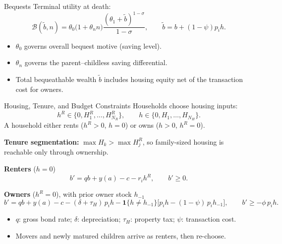 \documentclass[11pt,aspectratio=169]{beamer}
\begin{document}
\begin{frame}{Bequests}
\small
Terminal utility at death:
\[
\mathcal B(\widetilde b,n)= \theta_0\big(1+\theta_n n\big)\frac{(\theta_1+\widetilde b)^{1-\sigma}}{1-\sigma},
\qquad
\widetilde b=b+(1-\psi)p_i h.
\]
\begin{itemize}
  \vfill \item $\theta_0$ governs overall bequest motive (saving level).
  \vfill \item $\theta_n$ governs the parent--childless saving differential.
  \vfill \item Total bequeathable wealth $\widetilde b$ includes housing equity net of the transaction cost for owners.
\end{itemize}
\end{frame}

\begin{frame}{Housing, Tenure, and Budget Constraints}
\small
\setlength{\abovedisplayskip}{3pt}\setlength{\belowdisplayskip}{3pt}
Households choose housing inputs:
\[
h^R \in \{0, H^R_1,\ldots,H^R_{N_R}\},
\qquad
h \in \{0, H_1,\ldots,H_{N_H}\}.
\]
A household either rents ($h^R>0$, $h=0$) or owns ($h>0$, $h^R=0$).

\smallskip
\textbf{Tenure segmentation:} $\max H_k > \max H^R_j$, so family-sized housing is reachable only through ownership.

\smallskip
\textbf{Renters} ($h=0$)
\[
b' = qb + y(a) - c - r_i h^R,
\qquad b' \geq 0.
\]

\textbf{Owners} ($h^R=0$), with prior owner stock $h_{-1}$
\[
b' = qb + y(a) - c - (\delta+\tau_H)\,p_i h - \mathbf{1}\{h \neq h_{-1}\}\big[p_i h - (1-\psi)\,p_i h_{-1}\big],
\qquad b' \geq -\phi\,p_i h.
\]

\smallskip
\begin{itemize}\setlength\itemsep{2pt}
  \item $q$: gross bond rate; $\delta$: depreciation; $\tau_H$: property tax; $\psi$: transaction cost.
  \item Movers and newly matured children arrive as renters, then re-choose.
\end{itemize}
\end{frame}
\end{document}
